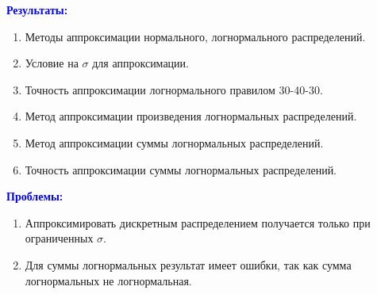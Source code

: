 \documentclass[ucs, notheorems, handout]{beamer}
\begin{document}
\begin{frame}{}
	
	
	\textcolor{blue}{\hbox{\textbf{Результаты:}}}
	\begin{enumerate}
		\item Методы аппроксимации нормального, логнормального распределений.
		\item Условие на $\sigma$ для аппроксимации.
		\item Точность аппроксимации логнормального правилом 30-40-30.
		\item Метод аппроксимации произведения логнормальных распределений.
		\item Метод аппроксимации суммы логнормальных распределений.
		\item Точность аппроксимации суммы логнормальных распределений.
	\end{enumerate}
	\bigskip
	\textcolor{blue}{\hbox{\textbf{Проблемы:}}}
	\begin{enumerate}
		\item Аппроксимировать дискретным распределением получается только при ограниченных $\sigma$.
		\item  Для суммы логнормальных результат имеет ошибки, так как сумма логнормальных не логнормальная.
	\end{enumerate}
	
\end{frame}


	
	
\end{document}
